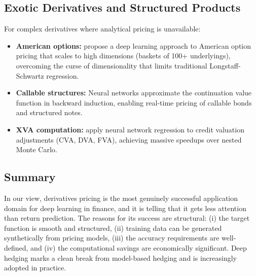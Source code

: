 \subsection{Exotic Derivatives and Structured Products}

For complex derivatives where analytical pricing is unavailable:

\begin{itemize}[leftmargin=*]
    \item \textbf{American options:} \citet{Becker2019} propose a deep learning approach to American option pricing that scales to high dimensions (baskets of 100+ underlyings), overcoming the curse of dimensionality that limits traditional Longstaff-Schwartz regression.

    \item \textbf{Callable structures:} Neural networks approximate the continuation value function in backward induction, enabling real-time pricing of callable bonds and structured notes.

    \item \textbf{XVA computation:} \citet{Gnoatto2023} apply neural network regression to credit valuation adjustments (CVA, DVA, FVA), achieving massive speedups over nested Monte Carlo.
\end{itemize}

\subsection{Summary}

In our view, derivatives pricing is the most genuinely successful application domain for deep learning in finance, and it is telling that it gets less attention than return prediction. The reasons for its success are structural: (i) the target function is smooth and structured, (ii) training data can be generated synthetically from pricing models, (iii) the accuracy requirements are well-defined, and (iv) the computational savings are economically significant. Deep hedging marks a clean break from model-based hedging and is increasingly adopted in practice.
